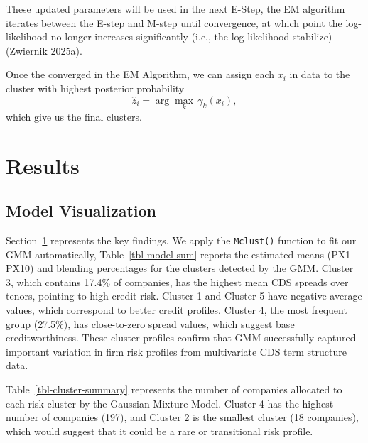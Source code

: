 \documentclass[
  letterpaper,
  DIV=11,
  numbers=noendperiod]{scrartcl}
\begin{document}
These updated parameters will be used in the next E-Step, the EM
algorithm iterates between the E-step and M-step until convergence, at
which point the log-likelihood no longer increases significantly (i.e.,
the log-likelihood stabilize) (Zwiernik 2025a).

Once the converged in the EM Algorithm, we can assign each \(x_i\) in
data to the cluster with highest posterior probability \[
\hat{z}_i = \arg\max_k \, \gamma_k(x_i),
\] which give us the final clusters.

\hypertarget{sec-result}{%
\section{Results}\label{sec-result}}

\hypertarget{model-visualization}{%
\subsection{Model Visualization}\label{model-visualization}}

Section~\ref{sec-result} represents the key findings. We apply the
\texttt{Mclust()} function to fit our GMM automatically,
Table~\ref{tbl-model-sum} reports the estimated means (PX1--PX10) and
blending percentages for the clusters detected by the GMM. Cluster 3,
which contains 17.4\% of companies, has the highest mean CDS spreads
over tenors, pointing to high credit risk. Cluster 1 and Cluster 5 have
negative average values, which correspond to better credit profiles.
Cluster 4, the most frequent group (27.5\%), has close-to-zero spread
values, which suggest base creditworthiness. These cluster profiles
confirm that GMM successfully captured important variation in firm risk
profiles from multivariate CDS term structure data.

Table~\ref{tbl-cluster-summary} represents the number of companies
allocated to each risk cluster by the Gaussian Mixture Model. Cluster 4
has the highest number of companies (197), and Cluster 2 is the smallest
cluster (18 companies), which would suggest that it could be a rare or
transitional risk profile.
\end{document}
